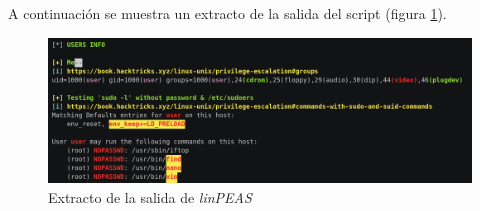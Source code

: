 A continuación se muestra un extracto de la salida del script (figura \ref{fig:linpeas-out}).

\begin{figure}[h]
    \centering
    \includegraphics[width=1.0\textwidth]{images/sections/tools/linpeas-out.png}
    \caption{Extracto de la salida de \textit{linPEAS}}
    \label{fig:linpeas-out}
\end{figure}